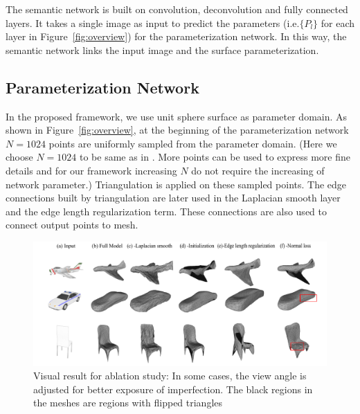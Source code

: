 The semantic network is built on convolution, deconvolution and fully connected layers. It takes a single image as input to predict the parameters (i.e.$\{P_l\}$ for each layer in Figure~\ref{fig:overview}) for the parameterization network. 
In this way, the semantic network links the input image and the surface parameterization.

\subsection{Parameterization Network}
\label{subsec:paramnet}
In the proposed framework, we use unit sphere surface as parameter domain.
As shown in Figure~\ref{fig:overview}, at the beginning of the parameterization network $N=1024$ points are uniformly sampled from the parameter domain. (Here we choose $N=1024$ to be same as in \cite{PSGN}. More points can be used to express more fine details and for our framework increasing $N$ do not require the increasing of network parameter.)
Triangulation is applied on these sampled points. 
The edge connections built by triangulation are later used in the Laplacian smooth layer and the edge length regularization term. 
These connections are also used to connect output points to mesh.
 
 \begin{figure}[htbp]
 	\centering
 	\includegraphics[width=\linewidth]{img/abl/abl}
 	\caption{Visual result for ablation study: In some cases, the view angle is adjusted for better exposure of imperfection. The black regions in the meshes are regions with flipped triangles}
 	\label{fig:abl}
 \end{figure}
 
